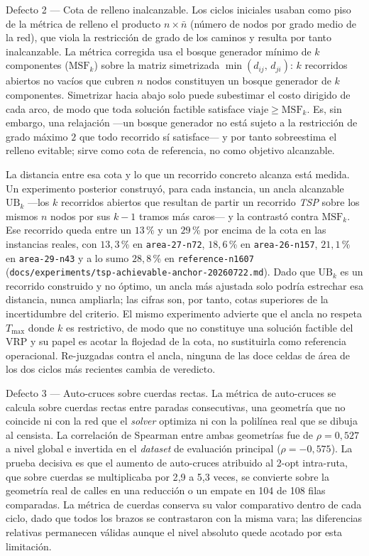 \begin{enumerate}
Defecto 2 --- Cota de relleno inalcanzable.
Los ciclos iniciales usaban como piso de la métrica de relleno el producto
$n \times \bar{n}$ (número de nodos por grado medio de la red), que viola la restricción
de grado de los caminos y resulta por tanto inalcanzable. La métrica corregida usa el
bosque generador mínimo de $k$ componentes ($\text{MSF}_k$) \citep{kruskal1956shortest}
sobre la matriz simetrizada $\min(d_{ij},\,d_{ji})$: $k$ recorridos abiertos no vacíos
que cubren $n$ nodos constituyen un bosque generador de $k$ componentes. Simetrizar
hacia abajo solo puede subestimar el costo dirigido de cada arco, de modo que toda
solución factible satisface $\text{viaje} \geq \text{MSF}_k$. Es, sin embargo, una
relajación ---un bosque generador no está sujeto a la restricción de grado máximo $2$
que todo recorrido sí satisface--- y por tanto sobreestima el relleno evitable; sirve
como cota de referencia, no como objetivo alcanzable.

La distancia entre esa cota y lo que un recorrido concreto alcanza está medida. Un
experimento posterior construyó, para cada instancia, un ancla alcanzable
$\text{UB}_k$ ---los $k$ recorridos abiertos que resultan de partir un recorrido
\textit{TSP} sobre los mismos $n$ nodos por sus $k-1$ tramos más caros--- y la
contrastó contra $\text{MSF}_k$. Ese recorrido queda entre un $13$\,\% y un $29$\,\%
por encima de la cota en las instancias reales, con $13{,}3$\,\% en
\texttt{area-27-n72}, $18{,}6$\,\% en \texttt{area-26-n157}, $21{,}1$\,\% en
\texttt{area-29-n43} y a lo sumo $28{,}8$\,\% en \texttt{reference-n1607}
(\texttt{docs/experiments/tsp-achievable-anchor-20260722.md}). Dado que $\text{UB}_k$
es un recorrido construido y no óptimo, un ancla más ajustada solo podría estrechar
esa distancia, nunca ampliarla; las cifras son, por tanto, cotas superiores de la
incertidumbre del criterio. El mismo experimento advierte que el ancla no respeta
$T_{\max}$ donde $k$ es restrictivo, de modo que no constituye una solución factible
del VRP y su papel es acotar la flojedad de la cota, no sustituirla como referencia
operacional. Re-juzgadas contra el ancla, ninguna de las doce celdas de área de los
dos ciclos más recientes cambia de veredicto.

Defecto 3 --- Auto-cruces sobre cuerdas rectas.
La métrica de auto-cruces se calcula sobre cuerdas rectas entre paradas consecutivas, una
geometría que no coincide ni con la red que el \textit{solver} optimiza ni con la
polilínea real que se dibuja al censista. La correlación de Spearman entre ambas
geometrías fue de $\rho = 0{,}527$ a nivel global e invertida en el \textit{dataset} de
evaluación principal ($\rho = -0{,}575$). La prueba decisiva es que el aumento de
auto-cruces atribuido al 2-opt intra-ruta, que sobre cuerdas se multiplicaba por 2{,}9 a
5{,}3 veces, se convierte sobre la geometría real de calles en una reducción o un empate
en 104 de 108 filas comparadas. La métrica de cuerdas conserva
su valor comparativo dentro de cada ciclo, dado que todos los brazos se contrastaron con la
misma vara; las diferencias relativas permanecen válidas aunque el nivel absoluto quede
acotado por esta limitación.


\end{enumerate}
